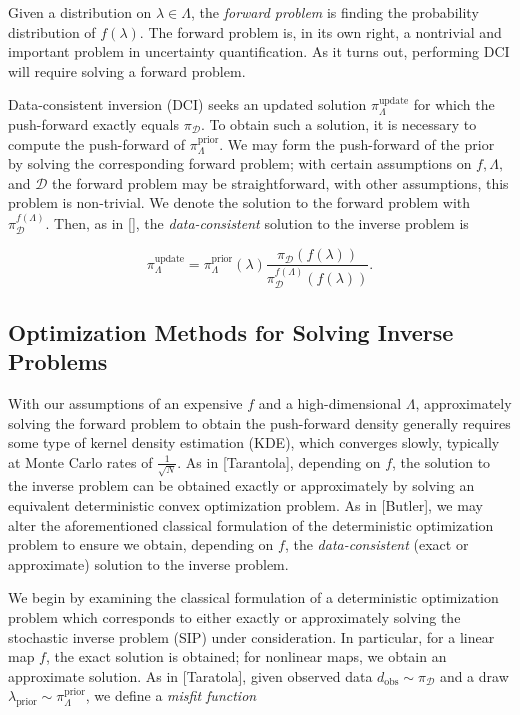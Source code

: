 \documentclass{amsart}
\begin{document}
Given a distribution on $\lambda \in \Lambda$, the \emph{forward problem} is finding the probability distribution of $f(\lambda)$. The forward problem is, in its own right, a nontrivial and important problem in uncertainty quantification. As it turns out, performing DCI will require solving a forward problem. 

Data-consistent inversion (DCI) seeks an updated solution $\pi_\Lambda^\text{update}$ for which the push-forward exactly equals $\pi_\mathcal{D}$. To obtain such a solution, it is necessary to compute the push-forward of $\pi_\Lambda^\text{prior}$. We may form the push-forward of the prior by solving the corresponding forward problem; with certain assumptions on $f, \Lambda,$ and $\mathcal{D}$ the forward problem may be straightforward, with other assumptions, this problem is non-trivial. We denote the solution to the forward problem with $\pi_\mathcal{D}^{f(\Lambda)}$. Then, as in [], the \textit{data-consistent} solution to the inverse problem is

\begin{equation} \label{eq:1}
\pi_\Lambda^\text{update}=\pi_\Lambda^\text{prior}(\lambda)\frac{\pi_\mathcal{D}(f(\lambda))}{\pi_\mathcal{D}^{f(\Lambda)}(f(\lambda))}.
\end{equation}

\subsection{Optimization Methods for Solving Inverse Problems}

With our assumptions of an expensive $f$ and a high-dimensional $\Lambda$, approximately solving the forward problem to obtain the push-forward density generally requires some type of kernel density estimation (KDE), which converges slowly, typically at Monte Carlo rates of $ \frac{1}{\sqrt{N}}$. As in [Tarantola], depending on $f$, the solution to the inverse problem can be obtained exactly or approximately by solving an equivalent deterministic convex optimization problem. As in [Butler], we may alter the aforementioned classical formulation of the deterministic optimization problem to ensure we obtain, depending on $f$, the \textit{data-consistent} (exact or approximate) solution to the inverse problem.

We begin by examining the classical formulation of a deterministic optimization problem which corresponds to either exactly or approximately solving the stochastic inverse problem (SIP) under consideration. In particular, for a linear map $f$, the exact solution is obtained; for nonlinear maps, we obtain an approximate solution. As in [Taratola], given observed data $d_{\text{obs}} \sim \pi_\mathcal{D}$ and a draw $\lambda_\text{prior}\sim \pi_\Lambda^\text{prior}$, we define a \textit{misfit function}
\end{document}
